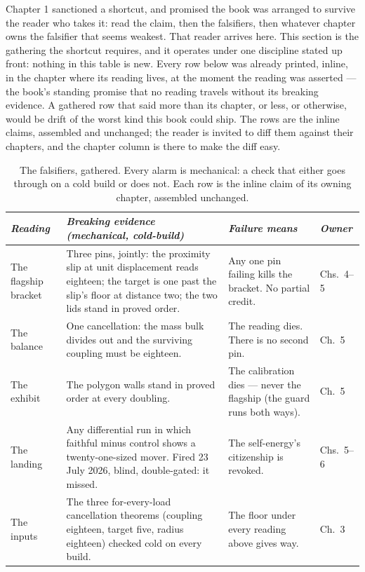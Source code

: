 Chapter 1 sanctioned a shortcut, and promised the book was arranged to survive the
reader who takes it: read the claim, then the falsifiers, then whatever chapter owns
the falsifier that seems weakest. That reader arrives here. This section is the
gathering the shortcut requires, and it operates under one discipline stated up
front: nothing in this table is new. Every row below was already printed, inline, in
the chapter where its reading lives, at the moment the reading was asserted --- the
book's standing promise that no reading travels without its breaking evidence. A
gathered row that said more than its chapter, or less, or otherwise, would be drift
of the worst kind this book could ship. The rows are the inline claims, assembled
and unchanged; the reader is invited to diff them against their chapters, and the
chapter column is there to make the diff easy.

\begin{table}[htbp]
\centering
\begin{tabular}{p{2.4cm} p{5.6cm} p{3.2cm} p{1.4cm}}
\hline
\emph{Reading} & \emph{Breaking evidence (mechanical, cold-build)} & \emph{Failure means} & \emph{Owner}\\
\hline
The flagship bracket & Three pins, jointly: the proximity slip at unit displacement
reads eighteen; the target is one past the slip's floor at distance two; the two
lids stand in proved order. & Any one pin failing kills the bracket. No partial
credit. & Chs.~4--5\\
\hline
The balance & One cancellation: the mass bulk divides out and the surviving
coupling must be eighteen. & The reading dies. There is no second pin. & Ch.~5\\
\hline
The exhibit & The polygon walls stand in proved order at every doubling. & The
calibration dies --- never the flagship (the guard runs both ways). & Ch.~5\\
\hline
The landing & Any differential run in which faithful minus control shows a
twenty-one-sized mover. Fired 23 July 2026, blind, double-gated: it missed. &
The self-energy's citizenship is revoked. & Chs.~5--6\\
\hline
The inputs & The three for-every-load cancellation theorems (coupling eighteen,
target five, radius eighteen) checked cold on every build. & The floor under
every reading above gives way. & Ch.~3\\
\hline
\end{tabular}
\caption{The falsifiers, gathered. Every alarm is mechanical: a check that either
goes through on a cold build or does not. Each row is the inline claim of its
owning chapter, assembled unchanged.}
\end{table}


